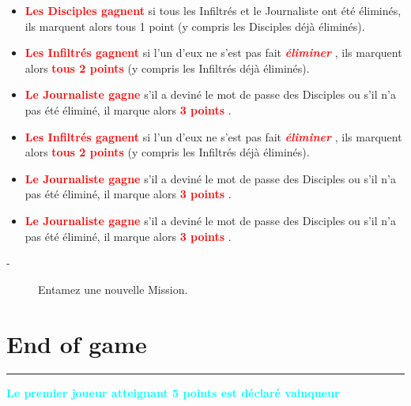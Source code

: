 \documentclass{article}%
\begin{document}
\begin{itemize}%
\item%
%
\textcolor{red}{%
\textbf{Les Disciples gagnent}%
}%
\textit{ }%
 si tous les Infiltrés et le Journaliste ont été éliminés, ils marquent alors tous 1 point (y compris les Disciples déjà éliminés).
%
\item%
%
\textcolor{red}{%
\textbf{Les Infiltrés gagnent}%
}%
\textit{ }%
 si l'un d'eux ne s'est pas fait %
\textcolor{red}{\textbf{\textit{éliminer}}}%
\textit{ }%
 , ils marquent alors %
\textcolor{red}{%
\textbf{tous 2 points}%
}%
\textit{ }%
 (y compris les Infiltrés déjà éliminés).
%
\item%
%
\textcolor{red}{%
\textbf{Le Journaliste gagne}%
}%
\textit{ }%
 s'il a deviné le mot de passe des Disciples ou s'il n'a pas été éliminé, il marque alors %
\textcolor{red}{%
\textbf{3 points}%
}%
.
%
\end{itemize}%
\begin{itemize}%
\item%
%
\textcolor{red}{%
\textbf{Les Infiltrés gagnent}%
}%
\textit{ }%
 si l'un d'eux ne s'est pas fait %
\textcolor{red}{\textbf{\textit{éliminer}}}%
\textit{ }%
 , ils marquent alors %
\textcolor{red}{%
\textbf{tous 2 points}%
}%
\textit{ }%
 (y compris les Infiltrés déjà éliminés).
%
\item%
%
\textcolor{red}{%
\textbf{Le Journaliste gagne}%
}%
\textit{ }%
 s'il a deviné le mot de passe des Disciples ou s'il n'a pas été éliminé, il marque alors %
\textcolor{red}{%
\textbf{3 points}%
}%
.
%
\end{itemize}%
\begin{itemize}%
\item%
%
\textcolor{red}{%
\textbf{Le Journaliste gagne}%
}%
\textit{ }%
 s'il a deviné le mot de passe des Disciples ou s'il n'a pas été éliminé, il marque alors %
\textcolor{red}{%
\textbf{3 points}%
}%
.
%
\end{itemize}%
\begin{description}%
\item[{-} ]%
%
 Entamez une nouvelle Mission.
%
\end{description}

%
\sectionfont{\color{cyan}}%
\subsectionfont{\color{cyan}}%
\subsubsectionfont{\color{cyan}}%
\section{ End of game
}%
\label{sec:Endofgame}%
\textcolor{cyan}{\rule{18cm}{0.07cm}}\break%
\textcolor{cyan}{%
\textbf{Le premier joueur atteignant 5 points est déclaré vainqueur}%
}

%
\end{document}
